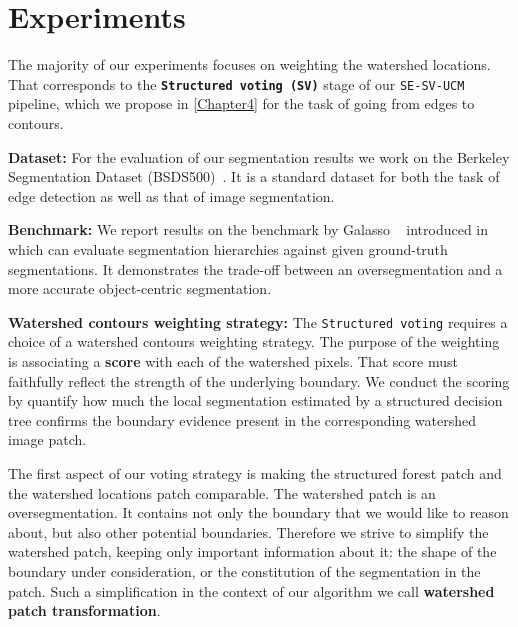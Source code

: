 \chapter{Experiments}
\label{Chapter5}
The majority of our experiments focuses on weighting the watershed locations. That corresponds to the \textbf{\texttt{Structured voting (SV)}} stage of our  {\tt SE-SV-UCM} pipeline, which we propose in \cref{Chapter4} for the task of going from edges to contours.

\textbf{Dataset:} For the evaluation of our segmentation results we work on the Berkeley Segmentation Dataset (BSDS500)~\cite{Arbelaez11}. It is a standard dataset for both the task of edge detection as well as that of image segmentation.

\textbf{Benchmark:} We report results on the benchmark by Galasso \etal~\cite{Galasso13Benchmark} introduced in~\cite{Galasso13} which can evaluate segmentation hierarchies against given ground-truth segmentations. It demonstrates the trade-off between an oversegmentation and a more accurate object-centric segmentation.

\textbf{Watershed contours weighting strategy:} The {\tt Structured voting} requires a choice of a watershed contours weighting strategy. The purpose of the weighting is associating a \textbf{score} with each of the watershed pixels. That score must faithfully reflect the strength of the underlying boundary. 
We conduct the scoring by quantify how much the local segmentation estimated by a structured decision tree confirms the boundary evidence present in the corresponding watershed image patch.

The first aspect of our voting strategy is making the structured forest patch and the watershed locations patch comparable. 
The watershed patch is an oversegmentation. It contains not only the boundary that we would like to reason about, but also other potential boundaries. 
Therefore we strive to simplify the watershed patch, keeping only important information about it: the shape of the boundary under consideration, or the constitution of the segmentation in the patch. Such a simplification in the context of our algorithm we call {\bf watershed patch transformation}. %

